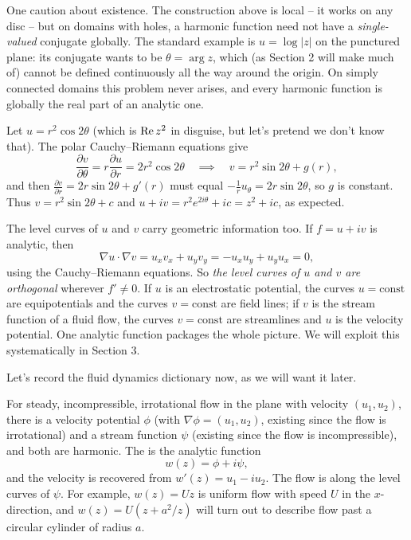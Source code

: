 \documentclass[a4paper]{scrartcl}
\begin{document}
One caution about existence. The construction above is local -- it works on any disc -- but on domains with holes, a harmonic function need not have a \emph{single-valued} conjugate globally. The standard example is $u = \log|z|$ on the punctured plane: its conjugate wants to be $\theta = \arg z$, which (as Section 2 will make much of) cannot be defined continuously all the way around the origin. On simply connected domains this problem never arises, and every harmonic function is globally the real part of an analytic one.

\begin{example}
	Let $u = r^2 \cos 2\theta$ (which is $\operatorname{Re} z^2$ in disguise, but let's pretend we don't know that). The polar Cauchy--Riemann equations give
	$$
	\frac{\partial v}{\partial \theta} = r \frac{\partial u}{\partial r} = 2r^2 \cos 2\theta
	\quad\implies\quad
	v = r^2 \sin 2\theta + g(r),
	$$
	and then $\frac{\partial v}{\partial r} = 2r \sin 2\theta + g'(r)$ must equal $-\frac 1r u_\theta = 2r \sin 2\theta$, so $g$ is constant. Thus $v = r^2 \sin 2\theta + c$ and $u + iv = r^2 e^{2i\theta} + ic = z^2 + ic$, as expected.
\end{example}

The level curves of $u$ and $v$ carry geometric information too. If $f = u + iv$ is analytic, then
$$
\nabla u \cdot \nabla v = u_x v_x + u_y v_y = -u_x u_y + u_y u_x = 0,
$$
using the Cauchy--Riemann equations. So \emph{the level curves of $u$ and $v$ are orthogonal} wherever $f' \neq 0$. If $u$ is an electrostatic potential, the curves $u = \text{const}$ are equipotentials and the curves $v = \text{const}$ are field lines; if $v$ is the stream function of a fluid flow, the curves $v = \text{const}$ are streamlines and $u$ is the velocity potential. One analytic function packages the whole picture. We will exploit this systematically in Section 3.

Let's record the fluid dynamics dictionary now, as we will want it later.

\begin{remark}
	For steady, incompressible, irrotational flow in the plane with velocity $(u_1, u_2)$, there is a velocity potential $\phi$ (with $\nabla \phi = (u_1, u_2)$, existing since the flow is irrotational) and a stream function $\psi$ (existing since the flow is incompressible), and both are harmonic. The  is the analytic function
	$$
	w(z) = \phi + i \psi,
	$$
	and the velocity is recovered from $w'(z) = u_1 - i u_2$. The flow is along the level curves of $\psi$. For example, $w(z) = Uz$ is uniform flow with speed $U$ in the $x$-direction, and $w(z) = U(z + a^2/z)$ will turn out to describe flow past a circular cylinder of radius $a$.
\end{remark}
\end{document}

